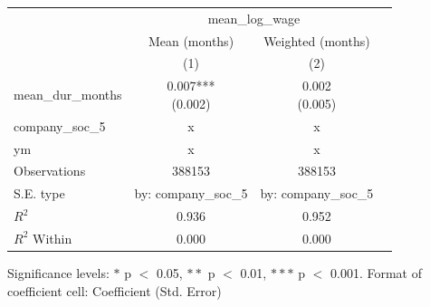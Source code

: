 \renewcommand\cellalign{t}
\begin{threeparttable}
\begin{tabular}{lccc}
\toprule
 & \multicolumn{2}{c}{mean_log_wage} \\
\cmidrule(lr){2-3} 
 & Mean (months) & Weighted (months) \\
 & (1) & (2) \\
\midrule
\addlinespace
mean_dur_months & \makecell{0.007*** \\ (0.002)} & \makecell{0.002 \\ (0.005)} \\
\midrule
\addlinespace
company_soc_5 & x & x \\
ym & x & x \\
\midrule
\addlinespace
Observations & 388153 & 388153 \\
S.E. type & by: company_soc_5 & by: company_soc_5 \\
$R^2$ & 0.936 & 0.952 \\
$R^2$ Within & 0.000 & 0.000 \\
\bottomrule
\end{tabular}
\footnotesize Significance levels: $*$ p $<$ 0.05, $**$ p $<$ 0.01, $***$ p $<$ 0.001. Format of coefficient cell: Coefficient 
 (Std. Error)
\end{threeparttable}